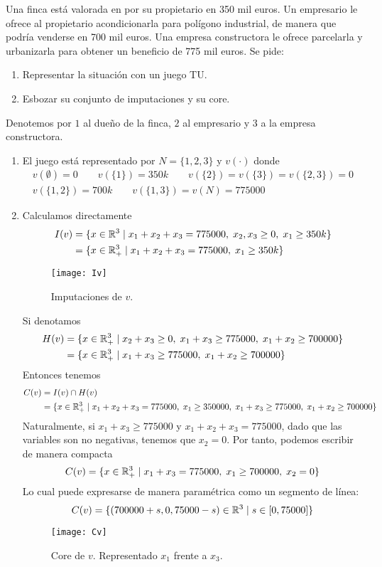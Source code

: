 \documentclass[twoside]{article}
\begin{document}
\newpage
\begin{ejercicio}{4}
Una finca está valorada en por su propietario en 350 mil euros. Un
empresario le ofrece al propietario acondicionarla para polígono
industrial, de manera que podría venderse en 700 mil euros. Una
empresa constructora le ofrece parcelarla y urbanizarla para obtener
un beneficio de 775 mil euros. Se pide:
\begin{enumerate}
\item Representar la situación con un juego TU.
\item Esbozar su conjunto de imputaciones y su core.
\end{enumerate}
\end{ejercicio}
\begin{solucion}
Denotemos por $1$ al dueño de la finca, $2$ al empresario y $3$ a la empresa constructora.
\begin{enumerate}
\item El juego está representado por $N=\{1,2,3\}$ y $v(\cdot)$ donde 
\begin{gather*}
v(\emptyset) = 0 \qquad v(\{1\}) = 350k \qquad v(\{2\}) = v(\{3\}) = v(\{2,3\}) = 0\\
v(\{1,2\}) = 700k \qquad v(\{1,3\}) = v(N) = 775000 
\end{gather*}
\item Calculamos directamente
\begin{align*}
I(v) &= \{x \in \mathbb{R}^3 \mid x_1+x_2+x_3 = 775000,\;x_2,x_3\geq 0,\;x_1\geq 350k\}\\
&=\{x\in \mathbb{R}^3_+ \mid x_1+x_2+x_3 = 775000,\; x_1 \geq 350k\}
\end{align*}

\begin{figure}[h!]
\centering
\texttt{[image: Iv]}
\caption{Imputaciones de $v$.}
\end{figure}

Si denotamos
\begin{align*}
H(v) &= \{x \in \mathbb{R}^3_+ \mid x_2+x_3 \geq 0,\; x_1+x_3 \geq 775000,\;x_1+x_2 \geq 700000\}\\
&=\{x \in \mathbb{R}^3_+ \mid  x_1+x_3 \geq 775000,\;x_1+x_2 \geq 700000\}
\end{align*}
Entonces tenemos
\begin{align*}
C(v) &= I(v) \cap H(v)\\
&=\{x \in \mathbb{R}^3_+ \mid x_1+x_2+x_3 = 775000,\;x_1 \geq 350000,\; x_1+x_3 \geq 775000,\;x_1+x_2 \geq 700000\}\
\end{align*}
Naturalmente, si $x_1+x_3 \geq 775000$ y $x_1+x_2+x_3 = 775000$, dado que las variables son no negativas, tenemos que $x_2 = 0$. Por tanto, podemos escribir de manera compacta
$$
C(v)=\{x \in \mathbb{R}^3_+ \mid x_1+x_3 =775000,\; x_1 \geq 700000,\; x_2 = 0\}
$$
Lo cual puede expresarse de manera paramétrica como un segmento de línea:
$$
C(v) = \{(700000 + s, 0, 75000 - s) \in \mathbb{R}^3 \mid s \in [0,75000]\}
$$

\begin{figure}[h!]
\centering
\texttt{[image: Cv]}
\caption{Core de $v$. Representado $x_1$ frente a $x_3$.}
\end{figure}
\end{enumerate}
\end{solucion}
\end{document}
